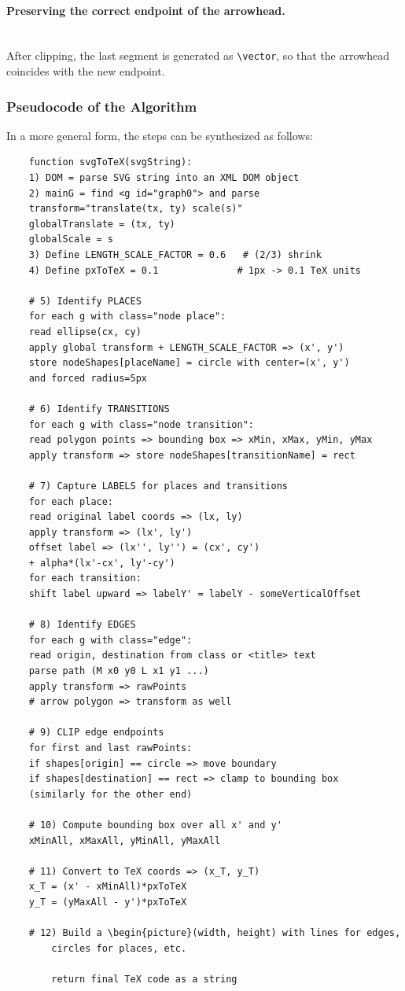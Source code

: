 \paragraph{Preserving the correct endpoint of the arrowhead.}
\mbox{}\\
After clipping, the last segment is generated as \texttt{\textbackslash vector}, so that the arrowhead coincides with the new endpoint.

\subsubsection{Pseudocode of the Algorithm}

\noindent In a more general form, the steps can be synthesized as follows:
\begin{verbatim}
	function svgToTeX(svgString):
	1) DOM = parse SVG string into an XML DOM object
	2) mainG = find <g id="graph0"> and parse
	transform="translate(tx, ty) scale(s)"
	globalTranslate = (tx, ty)
	globalScale = s
	3) Define LENGTH_SCALE_FACTOR = 0.6   # (2/3) shrink
	4) Define pxToTeX = 0.1              # 1px -> 0.1 TeX units
	
	# 5) Identify PLACES
	for each g with class="node place":
	read ellipse(cx, cy)
	apply global transform + LENGTH_SCALE_FACTOR => (x', y')
	store nodeShapes[placeName] = circle with center=(x', y')
	and forced radius=5px
	
	# 6) Identify TRANSITIONS
	for each g with class="node transition":
	read polygon points => bounding box => xMin, xMax, yMin, yMax
	apply transform => store nodeShapes[transitionName] = rect
	
	# 7) Capture LABELS for places and transitions
	for each place:
	read original label coords => (lx, ly)
	apply transform => (lx', ly')
	offset label => (lx'', ly'') = (cx', cy')
	+ alpha*(lx'-cx', ly'-cy')
	for each transition:
	shift label upward => labelY' = labelY - someVerticalOffset
	
	# 8) Identify EDGES
	for each g with class="edge":
	read origin, destination from class or <title> text
	parse path (M x0 y0 L x1 y1 ...)
	apply transform => rawPoints
	# arrow polygon => transform as well
	
	# 9) CLIP edge endpoints
	for first and last rawPoints:
	if shapes[origin] == circle => move boundary
	if shapes[destination] == rect => clamp to bounding box
	(similarly for the other end)
	
	# 10) Compute bounding box over all x' and y'
	xMinAll, xMaxAll, yMinAll, yMaxAll
	
	# 11) Convert to TeX coords => (x_T, y_T)
	x_T = (x' - xMinAll)*pxToTeX
	y_T = (yMaxAll - y')*pxToTeX
	
	# 12) Build a \begin{picture}(width, height) with lines for edges,
		circles for places, etc.
		
		return final TeX code as a string
	\end{verbatim}
	
